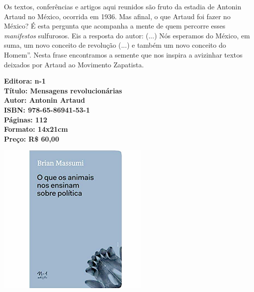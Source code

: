\hspace*{-7cm}\hrulefill\hspace*{-7cm}

\medskip

\noindent{}Os textos, conferências e artigos aqui reunidos são fruto da estadia de Antonin Artaud no México, ocorrida em 1936. Mas afinal, o que Artaud foi fazer no México? É esta pergunta que acompanha a mente de quem percorre esses \textit{manifestos} sulfurosos. Eis a resposta do autor:  (...) Nós esperamos do México, em suma, um novo conceito de revolução (...) e também um novo conceito do Homem''. Nesta frase encontramos a semente que nos inspira a avizinhar textos deixados por Artaud ao Movimento Zapatista.

\vfill

\hspace*{-.4cm}\begin{minipage}[c]{.5\linewidth}
\small\textbf{
\hspace*{-.1cm}Editora: n-1\\
Título: Mensagens revolucionárias\\
Autor: Antonin Artaud\\ 
ISBN: 978-65-86941-53-1\\
Páginas: 112\\
Formato: 14x21cm\\
Preço: R\$ 60,00\\
}
\end{minipage}

\pagebreak

\begin{center}
\hspace*{.5cm}\includegraphics[width=74mm]{./CAPAS/animais.jpg}
\end{center}

